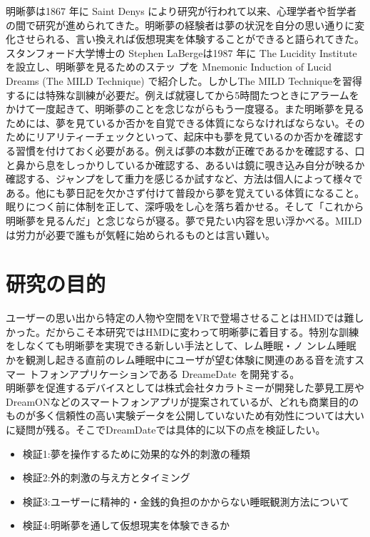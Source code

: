 明晰夢は1867 年に Saint Denys により研究が行われて以来\cite{saintDenys}、心理学者や哲学者の間で研究が進められてきた。明晰夢の経験者は夢の状況を自分の思い通りに変化させられる、言い換えれば仮想現実を体験することができると語られてきた。 スタンフォード大学博士の Stephen LaBergeは1987 年に The Lucidity Institute を設立し、明晰夢を見るためのステッ プを Mnemonic Induction of Lucid Dreams (The MILD Technique) で紹介した\cite{LaBerge}。しかしThe MILD Techniqueを習得するには特殊な訓練が必要だ。例えば就寝してから5時間たつときにアラームをかけて一度起きて、明晰夢のことを念じながらもう一度寝る。また明晰夢を見るためには、夢を見ているか否かを自覚できる体質にならなければならない。そのためにリアリティーチェックといって、起床中も夢を見ているのか否かを確認する習慣を付けておく必要がある。例えば夢の本数が正確であるかを確認する、口と鼻から息をしっかりしているか確認する、あるいは鏡に覗き込み自分が映るか確認する、ジャンプをして重力を感じるか試すなど、方法は個人によって様々である。他にも夢日記を欠かさず付けて普段から夢を覚えている体質になること。眠りにつく前に体制を正して、深呼吸をし心を落ち着かせる。そして「これから明晰夢を見るんだ」と念じならが寝る。夢で見たい内容を思い浮かべる。MILDは労力が必要で誰もが気軽に始められるものとは言い難い。

\section{研究の目的}
ユーザーの思い出から特定の人物や空間をVRで登場させることはHMDでは難しかった。だからこそ本研究ではHMDに変わって明晰夢に着目する。特別な訓練をしなくても明晰夢を実現できる新しい手法として、レム睡眠・ノ ンレム睡眠かを観測し起きる直前のレム睡眠中にユーザが望む体験に関連のある音を流すスマー トフォンアプリケーションである DreameDate を開発する。\\

明晰夢を促進するデバイスとしては株式会社タカラトミーが開発した夢見工房\cite{takaratomi}やDreamON\cite{dreamOn}などのスマートフォンアプリが提案されているが、どれも商業目的のものが多く信頼性の高い実験データを公開していないため有効性については大いに疑問が残る。そこでDreamDateでは具体的に以下の点を検証したい。

\begin{itemize}
\item 検証1:夢を操作するために効果的な外的刺激の種類
\item 検証2:外的刺激の与え方とタイミング
\item 検証3:ユーザーに精神的・金銭的負担のかからない睡眠観測方法について
\item 検証4:明晰夢を通して仮想現実を体験できるか
\end{itemize}

